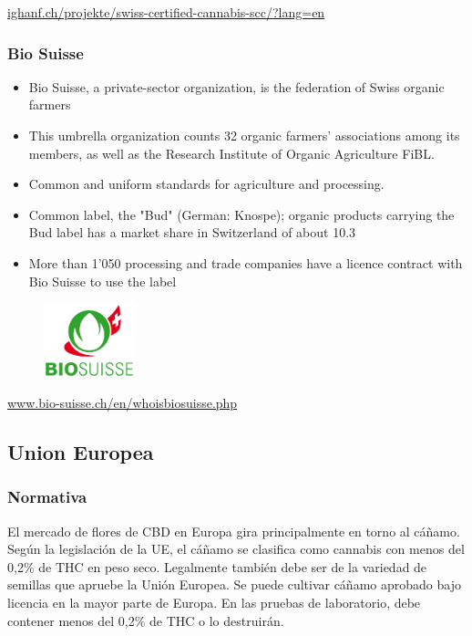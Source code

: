 \documentclass{article}
\begin{document}
\url{ighanf.ch/projekte/swiss-certified-cannabis-scc/?lang=en}

\subsubsection{Bio Suisse}

\begin{itemize}
	\item Bio Suisse, a private-sector organization, is the federation of Swiss organic farmers
	\item This umbrella organization counts 32 organic farmers' associations among its members, as well as the Research Institute of Organic Agriculture FiBL.
	\item Common and uniform standards for agriculture and processing.
	\item Common label, the "Bud" (German: Knospe); organic products carrying the Bud label has a market share in Switzerland of about 10.3%
	\item More than 1'050 processing and trade companies have a licence contract with Bio Suisse to use the label
\end{itemize}

\begin{figure}[H]
	\includegraphics[width=100px]{res/su-biosuisse.png}
	\label{fig:subio}
\end{figure}

\url{www.bio-suisse.ch/en/whoisbiosuisse.php}

\newpage

\subsection{Union Europea}

\subsubsection{Normativa}

El mercado de flores de CBD en Europa gira principalmente en torno al cáñamo. Según la legislación de la UE, el cáñamo se clasifica como cannabis con menos del 0,2\% de THC en peso seco. Legalmente también debe ser de la variedad de semillas que apruebe la Unión Europea. Se puede cultivar cáñamo aprobado bajo licencia en la mayor parte de Europa. En las pruebas de laboratorio, debe contener menos del 0,2\% de THC o lo destruirán.
\end{document}
